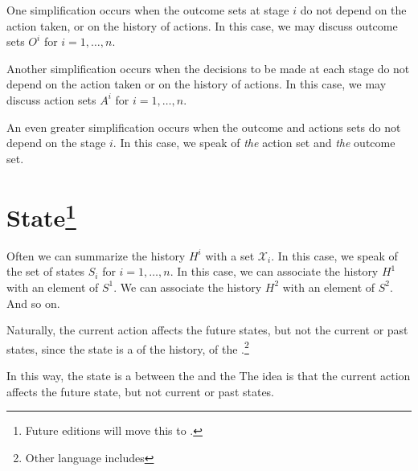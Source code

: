 One simplification occurs when the outcome sets at stage $i$ do not depend on the action taken, or on the history of actions.
In this case, we may discuss outcome sets $O^i$ for $i = 1, \dots , n$.

Another simplification occurs when the decisions to be made at each stage do not depend on the action taken or on the history of actions.
In this case, we may discuss action sets $A^i$ for $i = 1, \dots , n$.

An even greater simplification occurs when the outcome and actions sets do not depend on the stage $i$.
In this case, we speak of \textit{the} action set and \textit{the} outcome set.

\section*{State\footnote{Future editions will move this to .}}

Often we can summarize the history $H^i$ with a set $\mathcal{X} _i$.
In this case, we speak of the set of states $S_i$ for $i = 1, \dots , n$.
In this case, we can associate the history $H^1$ with an element of $S^1$.
We can associate the history $H^2$ with an element of $S^2$.
And so on.

Naturally, the current action affects the future states, but not the current or past states, since the state is a  of the history, of the .\footnote{Other language includes }

In this way, the state is a  between the  and the 
The idea is that the current action affects the future state, but not current or past states.

